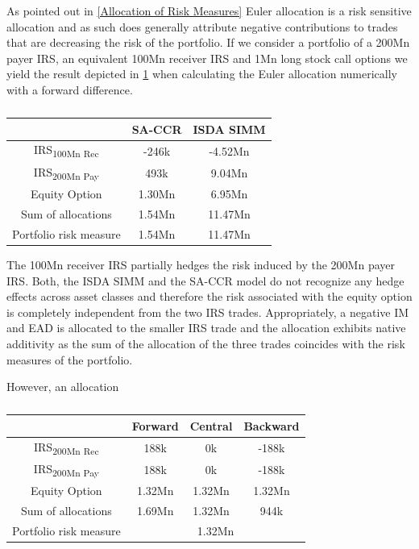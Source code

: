 \documentclass[../Thesis_AHoecherl.tex]{subfiles}
\begin{document}
    As pointed out in \ref{Allocation of Risk Measures} Euler allocation is a risk sensitive allocation and as such does generally attribute negative contributions to trades that are decreasing the risk of the portfolio. If we consider a portfolio of a 200Mn payer IRS, an equivalent 100Mn receiver IRS and 1Mn long stock call options we yield the result depicted in \ref{tab:hedge trade sample results} when calculating the Euler allocation numerically with a forward difference.
    \begin{table}[htbp]
        \label{tab:hedge trade sample results}
        \centering
            \begin{tabular}{c|c|c}
                & SA-CCR & ISDA SIMM \\
                \toprule
                IRS\textsubscript{100Mn Rec} & -246k & -4.52Mn \\
                \midrule
                IRS\textsubscript{200Mn Pay} & 493k & 9.04Mn \\
                \midrule
                Equity Option & 1.30Mn & 6.95Mn \\
                \bottomrule
                Sum of allocations & 1.54Mn & 11.47Mn \\
                \midrule
                Portfolio risk measure & 1.54Mn & 11.47Mn \\
            \end{tabular}%
        \caption{}
    \end{table}
    The 100Mn receiver IRS partially hedges the risk induced by the 200Mn payer IRS. 
    Both, the ISDA SIMM and the SA-CCR model do not recognize any hedge effects across asset classes and therefore the risk associated with the equity option is completely independent from the two IRS trades. 
    Appropriately, a negative IM and EAD is allocated to the smaller IRS trade and the allocation exhibits native additivity as the sum of the allocation of the three trades coincides with the risk measures of the portfolio.
    
    However, an allocation 

    \begin{table}[htbp]
        \label{tab:EAD perfect hedge}
        \centering
            \begin{tabular}{c|c|c|c}
                & Forward & Central & Backward \\
                \toprule
                IRS\textsubscript{200Mn Rec} & 188k & 0k & -188k \\
                \midrule
                IRS\textsubscript{200Mn Pay} & 188k & 0k & -188k\\
                \midrule
                Equity Option & 1.32Mn & 1.32Mn & 1.32Mn\\
                \bottomrule
                Sum of allocations & 1.69Mn & 1.32Mn & 944k \\
                \midrule
                Portfolio risk measure & \multicolumn{3}{c}{1.32Mn} \\
            \end{tabular}%
        \caption{}
    \end{table}
\end{document}
